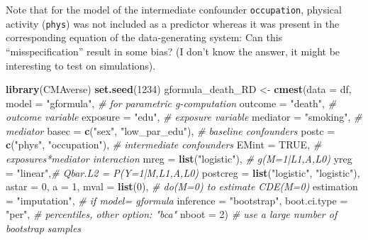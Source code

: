 \documentclass[
]{book}
\newenvironment{Shaded}{\begin{snugshade}}{\end{snugshade}}
\newcommand{\AttributeTok}[1]{\textcolor[rgb]{0.13,0.29,0.53}{#1}}
\newcommand{\CommentTok}[1]{\textcolor[rgb]{0.56,0.35,0.01}{\textit{#1}}}
\newcommand{\ConstantTok}[1]{\textcolor[rgb]{0.56,0.35,0.01}{#1}}
\newcommand{\DecValTok}[1]{\textcolor[rgb]{0.00,0.00,0.81}{#1}}
\newcommand{\FunctionTok}[1]{\textcolor[rgb]{0.13,0.29,0.53}{\textbf{#1}}}
\newcommand{\NormalTok}[1]{#1}
\newcommand{\OtherTok}[1]{\textcolor[rgb]{0.56,0.35,0.01}{#1}}
\newcommand{\StringTok}[1]{\textcolor[rgb]{0.31,0.60,0.02}{#1}}
\begin{document}
Note that for the model of the intermediate confounder \texttt{occupation}, physical activity (\texttt{phys}) was not included as a predictor whereas it was present in the corresponding equation of the data-generating system: Can this ``misspecification'' result in some bias? (I don't know the answer, it might be interesting to test on simulations).

\begin{Shaded}
\begin{Highlighting}[]
\FunctionTok{library}\NormalTok{(CMAverse)}
\FunctionTok{set.seed}\NormalTok{(}\DecValTok{1234}\NormalTok{)}
\NormalTok{gformula\_death\_RD }\OtherTok{\textless{}{-}} \FunctionTok{cmest}\NormalTok{(}\AttributeTok{data =}\NormalTok{ df, }
                           \AttributeTok{model =} \StringTok{"gformula"}\NormalTok{, }\CommentTok{\# for parametric g{-}computation}
                           \AttributeTok{outcome =} \StringTok{"death"}\NormalTok{, }\CommentTok{\# outcome variable}
                           \AttributeTok{exposure =} \StringTok{"edu"}\NormalTok{, }\CommentTok{\# exposure variable}
                           \AttributeTok{mediator =} \StringTok{"smoking"}\NormalTok{, }\CommentTok{\# mediator}
                           \AttributeTok{basec =} \FunctionTok{c}\NormalTok{(}\StringTok{"sex"}\NormalTok{,     }
                                     \StringTok{"low\_par\_edu"}\NormalTok{), }\CommentTok{\# baseline confounders}
                           \AttributeTok{postc =} \FunctionTok{c}\NormalTok{(}\StringTok{"phys"}\NormalTok{, }
                                     \StringTok{"occupation"}\NormalTok{), }\CommentTok{\# intermediate confounders }
                           \AttributeTok{EMint =} \ConstantTok{TRUE}\NormalTok{, }\CommentTok{\# exposures*mediator interaction}
                           \AttributeTok{mreg =} \FunctionTok{list}\NormalTok{(}\StringTok{"logistic"}\NormalTok{), }\CommentTok{\# g(M=1|L1,A,L0)}
                           \AttributeTok{yreg =} \StringTok{"linear"}\NormalTok{,}\CommentTok{\# Qbar.L2 = P(Y=1|M,L1,A,L0) }
                           \AttributeTok{postcreg =} \FunctionTok{list}\NormalTok{(}\StringTok{"logistic"}\NormalTok{, }\StringTok{"logistic"}\NormalTok{), }
                           \AttributeTok{astar =} \DecValTok{0}\NormalTok{,}
                           \AttributeTok{a =} \DecValTok{1}\NormalTok{,}
                           \AttributeTok{mval =} \FunctionTok{list}\NormalTok{(}\DecValTok{0}\NormalTok{), }\CommentTok{\# do(M=0) to estimate CDE(M=0)}
                           \AttributeTok{estimation =} \StringTok{"imputation"}\NormalTok{, }\CommentTok{\# if model= gformula}
                           \AttributeTok{inference =} \StringTok{"bootstrap"}\NormalTok{,}
                           \AttributeTok{boot.ci.type =} \StringTok{"per"}\NormalTok{, }\CommentTok{\# percentiles, other option: "bca"}
                           \AttributeTok{nboot =} \DecValTok{2}\NormalTok{) }\CommentTok{\# use a large number of bootstrap samples}
\end{Highlighting}
\end{Shaded}
\end{document}

